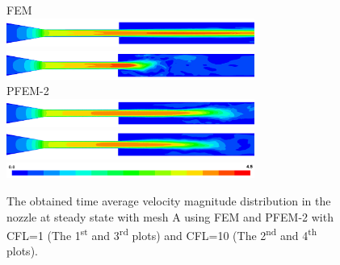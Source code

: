 \begin{figure}[htbp]
    \centering
    FEM\\
    \includegraphics[width=3.2in]{imgs/nozzle_pump/nozzle_fem_fm_cfl1.png}
    \includegraphics[width=3.2in]{imgs/nozzle_pump/nozzle_fem_fm_cfl5.png}\\
    PFEM-2\\
    \includegraphics[width=3.2in]{imgs/nozzle_pump/nozzle_pfem_fm_cfl1.png}
    \includegraphics[width=3.2in]{imgs/nozzle_pump/nozzle_pfem_fm_cfl5.png}
    \includegraphics[width=3.2in]{imgs/nozzle_pump/nozzle_legend.png}
    \caption{The obtained time average velocity magnitude distribution in the nozzle at steady state with mesh A using FEM and PFEM-2 with CFL=1 (The 1\textsuperscript{st} and 3\textsuperscript{rd} plots) and CFL=10 (The 2\textsuperscript{nd} and 4\textsuperscript{th} plots). }
    \label{fig:nozzlevelfm}
\end{figure}

